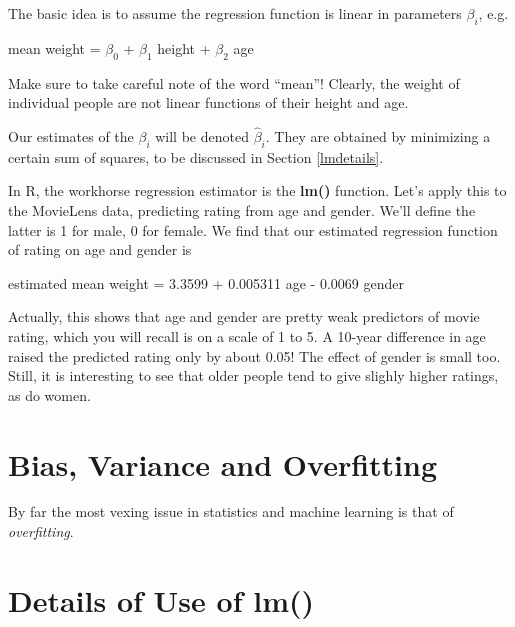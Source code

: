 The basic idea is to assume the regression function is linear in
parameters $\beta_i$, e.g.

mean weight = $\beta_0$ + $\beta_1$ height + $\beta_2$ age

Make sure to take careful note of the word ``mean''!  Clearly, the
weight of individual people are not linear functions of their height and
age.

Our estimates of the $\beta_i$ will be denoted $\widehat{\beta}_i$.
They are obtained by minimizing a certain sum of squares, to be
discussed in Section \ref{lmdetails}.

In R, the workhorse regression estimator is the \textbf{lm()} function.
Let's apply this to the MovieLens data, predicting rating from age and
gender.  We'll define the latter is 1 for male, 0 for female.  We find
that our estimated regression function of rating on age and gender is

estimated mean weight = 3.3599 + 0.005311 age - 0.0069 gender

Actually, this shows that age and gender are pretty weak predictors of
movie rating, which you will recall is on a scale of 1 to 5.  A 10-year
difference in age raised the predicted rating only by about 0.05!  The
effect of gender is small too.  Still, it is interesting to see that
older people tend to give slighly higher ratings, as do women.

\section{Bias, Variance and Overfitting}

By far the most vexing issue in statistics and machine learning is that
of \textit{overfitting}.

\section{Details of Use of lm()}


